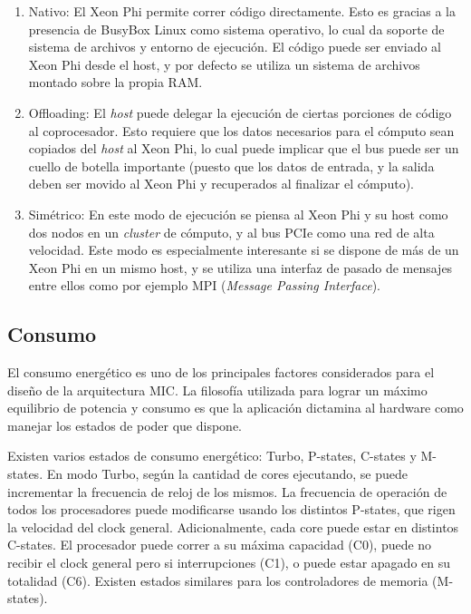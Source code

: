 \begin{enumerate}
    \item Nativo: El Xeon Phi permite correr c\'odigo directamente. Esto es gracias a la presencia de BusyBox Linux como sistema operativo,
    lo cual da soporte de sistema de archivos y entorno de ejecuci\'on. El c\'odigo puede ser enviado al Xeon Phi desde el host, y por defecto se utiliza un sistema
    de archivos montado sobre la propia RAM.
    \item Offloading: El \textit{host} puede delegar la ejecuci\'on de ciertas porciones de c\'odigo al coprocesador.
    Esto requiere que los datos necesarios para el c\'omputo sean copiados del \textit{host} al Xeon Phi, lo cual puede implicar que el bus puede ser un cuello de botella
    importante (puesto que los datos de entrada, y la salida deben ser movido al Xeon Phi y recuperados al finalizar el c\'omputo).
    \item Sim\'etrico: En este modo de ejecuci\'on se piensa al Xeon Phi y su host como dos nodos en un \textit{cluster} de c\'omputo, y al bus PCIe como una red de alta velocidad.
    Este modo es especialmente interesante si se dispone de m\'as de un Xeon Phi en un mismo host,
    y se utiliza una interfaz de pasado de mensajes entre ellos como por ejemplo MPI (\textit{Message Passing Interface}).
\end{enumerate}

\subsection{Consumo}

El consumo energ\'etico es uno de los principales factores considerados para el dise\~no de la arquitectura MIC. La filosof\'ia
utilizada para lograr un m\'aximo equilibrio de potencia y consumo es que la aplicaci\'on dictamina al hardware como
manejar los estados de poder que dispone.

Existen varios estados de consumo energ\'etico: Turbo, P-states, C-states y M-states. En modo Turbo, seg\'un la cantidad de
cores ejecutando, se puede incrementar la frecuencia de reloj de los mismos. La frecuencia de operaci\'on de todos los procesadores
puede modificarse usando los distintos P-states, que rigen la velocidad del clock general. Adicionalmente, cada core puede estar en
distintos C-states. El procesador puede correr a su m\'axima capacidad (C0), puede no recibir el clock general pero si interrupciones
(C1), o puede estar apagado en su totalidad (C6). Existen estados similares para los controladores de memoria (M-states).

